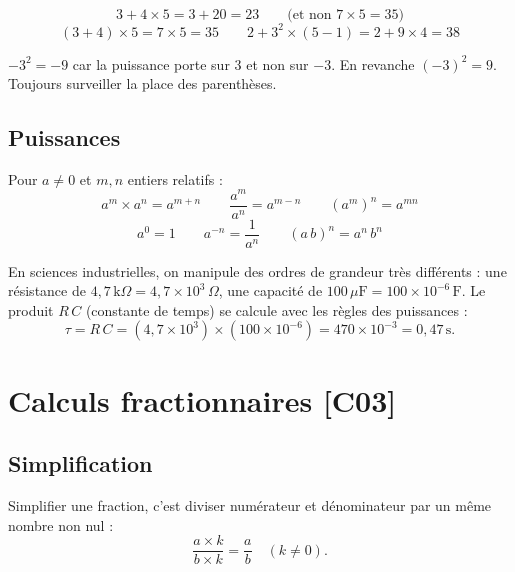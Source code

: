 \documentclass[a4paper,11pt]{article}
\begin{document}
\begin{exemple}[-- Priorités]
\[
3 + 4 \times 5 = 3 + 20 = 23 \qquad\text{(et non } 7 \times 5 = 35\text{)}
\]
\[
(3 + 4) \times 5 = 7 \times 5 = 35 \qquad 2 + 3^2 \times (5 - 1) = 2 + 9 \times 4 = 38
\]
\end{exemple}

\begin{piege}
$-3^2 = -9$ car la puissance porte sur $3$ et non sur $-3$. En revanche $(-3)^2 = 9$. Toujours surveiller la place des parenthèses.
\end{piege}

\subsection{Puissances}

\begin{theoreme}
Pour $a \neq 0$ et $m, n$ entiers relatifs :
\[
a^m \times a^n = a^{m+n} \qquad \frac{a^m}{a^n} = a^{m-n} \qquad (a^m)^n = a^{mn}
\]
\[
a^0 = 1 \qquad a^{-n} = \frac{1}{a^n} \qquad (a\,b)^n = a^n\,b^n
\]
\end{theoreme}

\begin{appliindus}
En sciences industrielles, on manipule des ordres de grandeur très différents : une résistance de $4{,}7\,\text{k}\Omega = 4{,}7 \times 10^{3}\,\Omega$, une capacité de $100\,\mu\text{F} = 100 \times 10^{-6}\,\text{F}$. Le produit $R\,C$ (constante de temps) se calcule avec les règles des puissances :
\[
\tau = R\,C = (4{,}7 \times 10^{3}) \times (100 \times 10^{-6}) = 470 \times 10^{-3} = 0{,}47\,\text{s}.
\]
\end{appliindus}

\newpage
\section{Calculs fractionnaires \hfill {\normalsize\color{uimmred}[C03]}}

\subsection{Simplification}

\begin{definition}
Simplifier une fraction, c'est diviser numérateur et dénominateur par un même nombre non nul :
\[
\frac{a \times k}{b \times k} = \frac{a}{b} \quad (k \neq 0).
\]
\end{definition}
\end{document}
